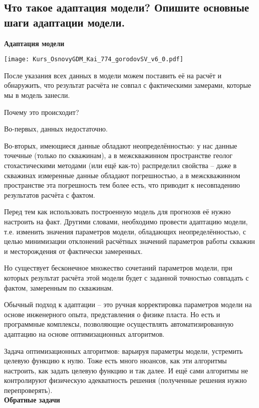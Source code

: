 

\subsection{Что такое адаптация модели? Опишите основные шаги адаптации модели.}

\textbf{Адаптация модели}

\texttt{[image: Kurs\_OsnovyGDM\_Kai\_774\_gorodovSV\_v6\_0.pdf]}

После указания всех данных в модели можем поставить её на расчёт и обнаружить, что результат расчёта не совпал с фактическими замерами, которые мы в модель занесли.

Почему это происходит?

Во-первых, данных недостаточно.

Во-вторых, имеющиеся данные обладают неопределённостью: у нас данные точечные (только по скважинам), а в межскважинном пространстве геолог стохастическими методами (или ещё как-то) распределил свойства -- даже в скважинах измеренные данные обладают погрешностью, а в межскважинном пространстве эта погрешность тем более есть, что приводит к несовпадению результатов расчёта с фактом.

Перед тем как использовать построенную модель для прогнозов её нужно настроить на факт.
Другими словами, необходимо провести адаптацию модели, т.е. изменить значения параметров модели, обладающих неопределённостью, с целью минимизации отклонений расчётных значений параметров работы скважин и месторождения от фактически замеренных.

Но существует бесконечное множество сочетаний параметров модели, при которых результат расчёта этой модели будет с заданной точностью совпадать с фактом, замеренным по скважинам.

Обычный подход к адаптации -- это ручная корректировка параметров модели на основе инженерного опыта, представления о физике пласта. Но есть и программные комплексы, позволяющие осуществлять автоматизированную адаптацию на основе оптимизационных алгоритмов.

Задача оптимизационных алгоритмов: варьируя параметры модели, устремить целевую функцию к нулю.
Тоже есть много нюансов, как эти алгоритмы настроить, как задать целевую функцию и так далее.
И ещё сами алгоритмы не контролируют физическую адекватность решения (полученные решения нужно перепроверять).
\\

\textbf{Обратные задачи}

